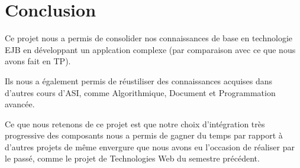 \chapter*{Conclusion}
\thispagestyle{fancy}

Ce projet nous a permis de consolider nos connaissances de base en technologie EJB en développant un applcation complexe (par comparaison avec ce que nous avons fait en TP).

Ils nous a également permis de réustiliser des connaissances acquises dans d'autres cours d'ASI, comme Algorithmique, Document et Programmation avancée.

Ce que nous retenons de ce projet est que notre choix d'intégration très progressive des composants nous a permis de gagner du temps par rapport à d'autres projets de même envergure que nous avons eu l'occasion de réaliser par le passé, comme le projet de Technologies Web du semestre précédent.
